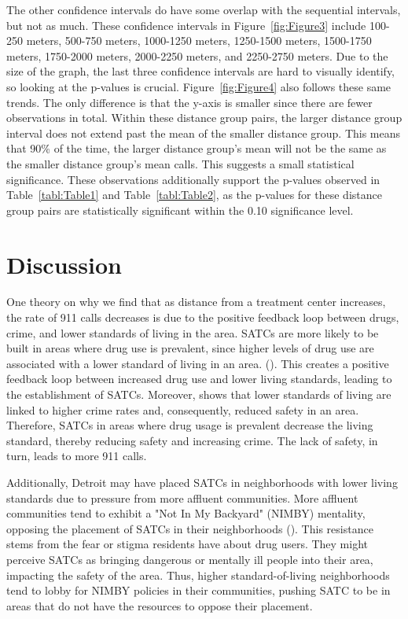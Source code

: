\documentclass[12pt]{article}
\begin{document}
The other confidence intervals do have some overlap with the sequential intervals, but not as much. These confidence intervals in Figure~\ref{fig:Figure3} include 100-250 meters, 500-750 meters, 1000-1250 meters, 1250-1500 meters, 1500-1750 meters, 1750-2000 meters, 2000-2250 meters, and 2250-2750 meters. Due to the size of the graph, the last three confidence intervals are hard to visually identify, so looking at the p-values is crucial. Figure~\ref{fig:Figure4} also follows these same trends. The only difference is that the y-axis is smaller since there are fewer observations in total. Within these distance group pairs, the larger distance group interval does not extend past the mean of the smaller distance group. This means that 90\% of the time, the larger distance group's mean will not be the same as the smaller distance group's mean calls. This suggests a small statistical significance. These observations additionally support the p-values observed in Table~\ref{tabl:Table1} and Table~\ref{tabl:Table2}, as the p-values for these distance group pairs are statistically significant within the 0.10 significance level. 


\break
\section{Discussion}
\label{sec:discussion}

One theory on why we find that as distance from a treatment center increases, the rate of 911 calls decreases is due to the positive feedback loop between drugs, crime, and lower standards of living in the area. SATCs are more likely to be built in areas where drug use is prevalent, since higher levels of drug use are associated with a lower standard of living in an area. (\cite{drugs_and_crime}). This creates a positive feedback loop between increased drug use and lower living standards, leading to the establishment of SATCs. Moreover, \cite{drugs_and_crime} shows that lower standards of living are linked to higher crime rates and, consequently, reduced safety in an area. Therefore, SATCs in areas where drug usage is prevalent decrease the living standard, thereby reducing safety and increasing crime. The lack of safety, in turn, leads to more 911 calls.  

Additionally, Detroit may have placed SATCs in neighborhoods with lower living standards due to pressure from more affluent communities. More affluent communities tend to exhibit a "Not In My Backyard" (NIMBY) mentality, opposing the placement of SATCs in their neighborhoods (\cite{NIMBY}). This resistance stems from the fear or stigma residents have about drug users. They might perceive SATCs as bringing dangerous or mentally ill people into their area, impacting the safety of the area. Thus, higher standard-of-living neighborhoods tend to lobby for NIMBY policies in their communities, pushing SATC to be in areas that do not have the resources to oppose their placement.
\end{document}
